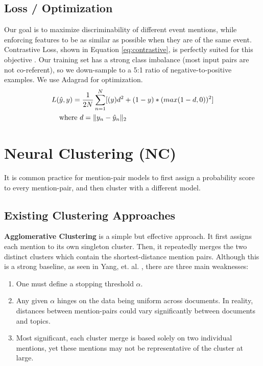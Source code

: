 \subsection{Loss / Optimization}
Our goal is to maximize discriminability of different event mentions, while enforcing features to be as similar as possible when they are of the same event.  Contrastive Loss, shown in Equation \ref{eq:contrastive}, is perfectly suited for this objective \cite{SchroffKP15,pmlr-v48-liud16}. Our training set has a strong class imbalance (most input pairs are not co-referent), so we down-sample to a 5:1 ratio of negative-to-positive examples.  We use Adagrad for optimization.
\begin{equation}
\begin{aligned}
L(&\hat{y},y)=\frac{1}{2N}\sum_{n=1}^{N}[(y)d^2 + (1-y)*(max(1-d,0))^2] \\
&\textnormal{where }d=\|y_{n}-\hat{y}_{n}\|_{2}
\end{aligned}
\label{eq:contrastive}
\end{equation}



\section{Neural Clustering (NC)}
\label{sec:clustering}
It is common practice for mention-pair models to first assign a probability score to every mention-pair, and then cluster with a different model.

\subsection{Existing Clustering Approaches}
\textbf{Agglomerative Clustering} is a simple but effective approach.  It first assigns each mention to its own singleton cluster.  Then, it repeatedly merges the two distinct clusters which contain the shortest-distance mention pairs.  Although this is a strong baseline, as seen in Yang, et. al. \cite{journals/tacl/YangCF15}, there are three main weaknesses:
\begin{enumerate}
\item One must define a stopping threshold $\alpha$.
\item Any given $\alpha$ hinges on the data being uniform across documents.  In reality, distances between mention-pairs could vary significantly between documents and topics.
\item Most significant, each cluster merge is based solely on two individual mentions, yet these mentions may not be representative of the cluster at large.
\end{enumerate}

